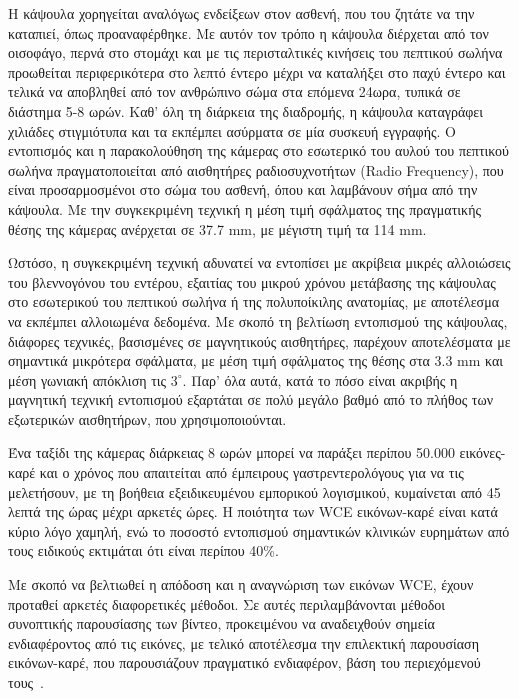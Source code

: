 H κάψουλα χορηγείται αναλόγως ενδείξεων στον ασθενή, που του ζητάτε να την καταπιεί, όπως προαναφέρθηκε. Με αυτόν τον τρόπο η κάψουλα διέρχεται από τον οισοφάγο, περνά στο στομάχι
και με τις περισταλτικές κινήσεις του πεπτικού σωλήνα προωθείται περιφερικότερα στο λεπτό έντερο μέχρι να καταλήξει στο παχύ έντερο και τελικά να αποβληθεί από τον ανθρώπινο σώμα στα επόμενα 24ωρα, 
τυπικά σε διάστημα 5-8 ωρών. Καθ' όλη τη διάρκεια της διαδρομής, η κάψουλα καταγράφει χιλιάδες στιγμιότυπα και τα εκπέμπει ασύρματα σε μία συσκευή εγγραφής.
Ο εντοπισμός και η παρακολούθηση της κάμερας στο εσωτερικό του αυλού του πεπτικού σωλήνα πραγματοποιείται από αισθητήρες ραδιοσυχνοτήτων (Radio Frequency), 
που είναι προσαρμοσμένοι στο σώμα του ασθενή, όπου και λαμβάνουν σήμα από την κάψουλα. Με την συγκεκριμένη τεχνική η μέση τιμή σφάλματος της πραγματικής
θέσης της κάμερας ανέρχεται σε 37.7 mm, με μέγιστη τιμή τα 114 mm. \par
Ωστόσο, η συγκεκριμένη τεχνική αδυνατεί να εντοπίσει με ακρίβεια μικρές αλλοιώσεις του βλεννογόνου του εντέρου, 
εξαιτίας του μικρού χρόνου μετάβασης της κάψουλας στο εσωτερικού του πεπτικού σωλήνα ή της πολυποίκιλης ανατομίας, με αποτέλεσμα να εκπέμπει αλλοιωμένα δεδομένα. 
Με σκοπό τη βελτίωση εντοπισμού της κάψουλας, διάφορες τεχνικές, βασισμένες σε μαγνητικούς αισθητήρες, παρέχουν αποτελέσματα με σημαντικά μικρότερα σφάλματα, 
με μέση τιμή σφάλματος της θέσης στα 3.3 mm και μέση γωνιακή απόκλιση τις $3^{\circ}$. Παρ' όλα αυτά, κατά το πόσο είναι ακριβής η μαγνητική τεχνική εντοπισμού εξαρτάται σε
πολύ μεγάλο βαθμό από το πλήθος των εξωτερικών αισθητήρων, που χρησιμοποιούνται.\par
Ένα ταξίδι της κάμερας διάρκειας 8 ωρών μπορεί να παράξει περίπου 50.000 εικόνες-καρέ και ο χρόνος που απαιτείται από έμπειρους γαστρεντερολόγους για να τις μελετήσουν,
με τη βοήθεια εξειδικευμένου εμπορικού λογισμικού, κυμαίνεται από 45 λεπτά της ώρας μέχρι αρκετές ώρες.
Η ποιότητα των WCE εικόνων-καρέ είναι κατά κύριο λόγο χαμηλή, ενώ το ποσοστό εντοπισμού σημαντικών κλινικών ευρημάτων από τους ειδικούς
εκτιμάται ότι είναι περίπου 40\%.\par
Με σκοπό να βελτιωθεί η απόδοση και η αναγνώριση των εικόνων WCE, έχουν προταθεί αρκετές διαφορετικές μέθοδοι. Σε αυτές 
περιλαμβάνονται μέθοδοι συνοπτικής παρουσίασης των βίντεο, προκειμένου να αναδειχθούν σημεία ενδιαφέροντος από τις εικόνες, με τελικό αποτέλεσμα 
την επιλεκτική παρουσίαση εικόνων-καρέ, που παρουσιάζουν πραγματικό ενδιαφέρον, βάση του περιεχόμενού τους~\cite{zheng2012detection}. 




